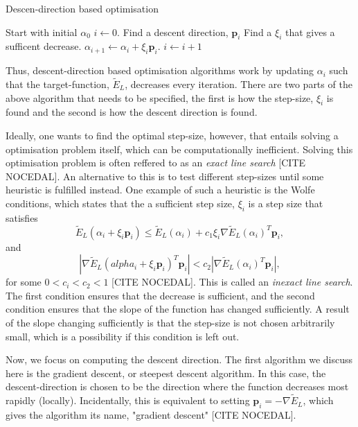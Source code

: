 \documentclass[11pt,a4paper]{article}
\numberwithin{equation}{section}
\begin{document}
\begin{algorithm}
	\caption{Descen-direction based optimisation}
	\label{Alg:descentOptimisation}
	\begin{algorithmic}[1]
        \State Start with initial $\alpha_0$
        \State $i \gets 0$.
        \State Find a descent direction, $\bm{p}_i$
        \State Find a $\xi_i$ that gives a sufficent decrease.
        \State $\alpha_{i+1} \gets \alpha_i + \xi_i \bm{p}_i$.
        \State $i \gets i + 1$
        \EndWhile
		\EndProcedure
	\end{algorithmic}
\end{algorithm}

Thus, descent-direction based optimisation algorithms work by updating $\alpha_i$ such that the target-function, $\tilde{E}_L$, decreases every iteration. There are two parts of the above algorithm that needs to be specified, the first is how the step-size, $\xi_i$ is found and the second is how the descent direction is found. 

Ideally, one wants to find the optimal step-size, however, that entails solving a optimisation problem itself, which can be computationally inefficient. Solving this optimisation problem is often reffered to as an \emph{exact line search} [CITE NOCEDAL]. An alternative to this is to test different step-sizes until some heuristic is fulfilled instead. One example of such a heuristic is the Wolfe conditions, which states that the a sufficient step size, $\xi_i$ is a step size that satisfies
\begin{equation}
    \tilde{E}_L(\alpha_i + \xi_i \bm{p}_i) \leq \tilde{E}_L(\alpha_i) + c_1\xi_i \nabla \tilde{E}_L(\alpha_i)^T\bm{p}_i,
\end{equation}
and
\begin{equation}
    |\nabla \tilde{E}_L(alpha_i + \xi_i \bm{p}_i)^T\bm{p}_i| < c_2 |\nabla \tilde{E}_L(\alpha_i)^T \bm{p}_i |,
\end{equation}
for some $0 < c_i < c_2 < 1$ [CITE NOCEDAL]. This is called an \emph{inexact line search}. The first condition ensures that the decrease is sufficient, and the second condition ensures that the slope of the function has changed sufficiently. A result of the slope changing sufficiently is that the step-size is not chosen arbitrarily small, which is a possibility if this condition is left out.

Now, we focus on computing the descent direction. The first algorithm we discuss here is the gradient descent, or steepest descent algorithm. In this case, the descent-direction is chosen to be the direction where the function decreases most rapidly (locally). Incidentally, this is equivalent to setting $\bm{p}_i = -\nabla \tilde{E}_L$, which gives the algorithm its name, "gradient descent" [CITE NOCEDAL].
\end{document}
